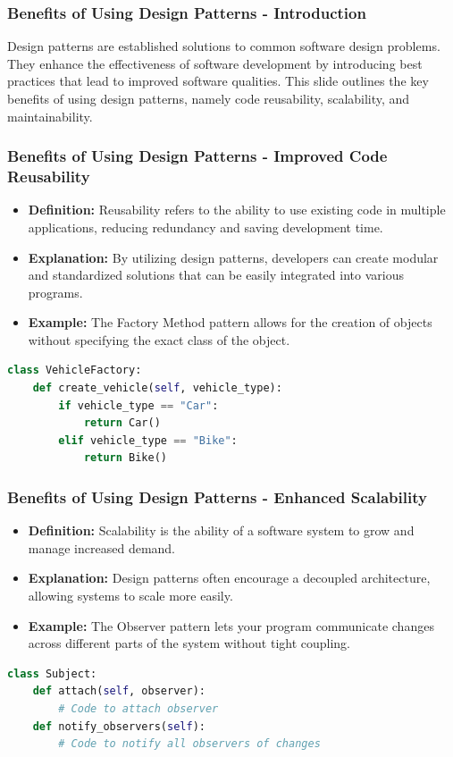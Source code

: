 \documentclass{beamer}
\begin{document}
\begin{frame}[fragile]
    \frametitle{Benefits of Using Design Patterns - Introduction}
    Design patterns are established solutions to common software design problems. They enhance the effectiveness of software development by introducing best practices that lead to improved software qualities. This slide outlines the key benefits of using design patterns, namely code reusability, scalability, and maintainability.
\end{frame}

\begin{frame}[fragile]
    \frametitle{Benefits of Using Design Patterns - Improved Code Reusability}
    \begin{itemize}
        \item \textbf{Definition:} Reusability refers to the ability to use existing code in multiple applications, reducing redundancy and saving development time.
        \item \textbf{Explanation:} By utilizing design patterns, developers can create modular and standardized solutions that can be easily integrated into various programs.
        \item \textbf{Example:} The Factory Method pattern allows for the creation of objects without specifying the exact class of the object.
    \end{itemize}
    \begin{lstlisting}[language=Python]
class VehicleFactory:
    def create_vehicle(self, vehicle_type):
        if vehicle_type == "Car":
            return Car()
        elif vehicle_type == "Bike":
            return Bike()
    \end{lstlisting}
\end{frame}

\begin{frame}[fragile]
    \frametitle{Benefits of Using Design Patterns - Enhanced Scalability}
    \begin{itemize}
        \item \textbf{Definition:} Scalability is the ability of a software system to grow and manage increased demand.
        \item \textbf{Explanation:} Design patterns often encourage a decoupled architecture, allowing systems to scale more easily.
        \item \textbf{Example:} The Observer pattern lets your program communicate changes across different parts of the system without tight coupling.
    \end{itemize}
    \begin{lstlisting}[language=Python]
class Subject:
    def attach(self, observer):
        # Code to attach observer
    def notify_observers(self):
        # Code to notify all observers of changes
    \end{lstlisting}
\end{frame}
\end{document}
